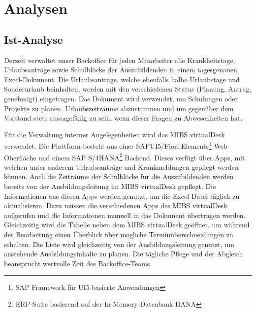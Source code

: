 \section{Analysen}
\label{sec:Analysen}

\subsection{Ist-Analyse}
\label{sec:Ist-Analyse}
Derzeit verwaltet unser Backoffice für jeden Mitarbeiter alle Krankheitstage, Urlaubsanträge sowie Schulblöcke der Auszubildenden in einem tagesgenauen Excel-Dokument. Die Urlaubsanträge, welche ebenfalls halbe Urlaubstage und Sonderurlaub beinhalten, werden mit den verschiedenen Status (Planung, Antrag, genehmigt) eingetragen.
Das Dokument wird verwendet, um Schulungen oder Projekte zu planen, Urlaubszeiträume abzustimmen und um gegenüber dem Vorstand stets aussagefähig zu sein, wenn dieser Fragen zu Abwesenheiten hat. 

Für die Verwaltung interner Angelegenheiten wird das MIBS virtualDesk verwendet. Die Plattform besteht aus einer SAPUI5/Fiori Elements\footnote{\label{Fiori}SAP Framework für UI5-basierte Anwendungen} Web-Oberfläche und einem SAP S/4HANA\footnote{ERP-Suite basierend auf der In-Memory-Datenbank HANA} Backend. Dieses verfügt über Apps, mit welchen unter anderem Urlaubsanträge und Krankmeldungen gepflegt werden können. Auch die Zeiträume der Schulblöcke für die Auszubildenden werden bereits von der Ausbildungsleitung im MIBS virtualDesk gepflegt. Die Informationen aus diesen Apps werden genutzt, um die Excel-Datei täglich zu aktualisieren. Dazu müssen die verschiedenen Apps des MIBS virtualDesk aufgerufen und die Informationen manuell in das Dokument übertragen werden. Gleichzeitig wird die Tabelle neben dem MIBS virtualDesk geöffnet, um während der Bearbeitung einen Überblick über mögliche Terminüberschneidungen zu erhalten. Die Liste wird gleichzeitig von der Ausbildungsleitung genutzt, um anstehende Ausbildungsinhalte zu planen. Die tägliche Pflege und der Abgleich beansprucht wertvolle Zeit des Backoffice-Teams.



